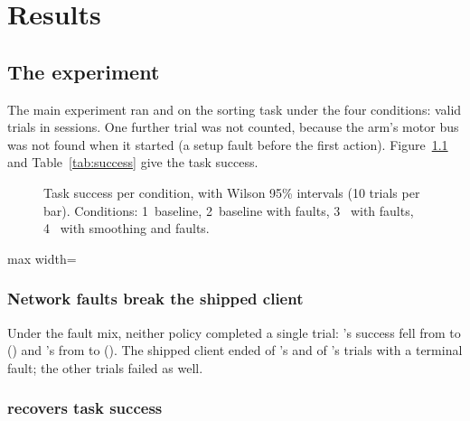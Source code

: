 \chapter{Results}\label{ch:results}

\section{The \drtc{} experiment}\label{sec:main}

The main experiment ran \smolvla{} and \groot{} on the sorting task under the four conditions:  valid trials
in  sessions. One further trial was not counted, because the arm's motor bus was not found when it
started (a setup fault before the first action). Figure~\ref{fig:success} and Table~\ref{tab:success} give the task
success.

\begin{figure}[htbp]
  \centering
  \caption{Task success per condition, with Wilson 95\% intervals (10 trials per bar). Conditions: 1~baseline,
           2~baseline with faults, 3~\drtc{} with faults, 4~\drtc{} with smoothing and faults.}
  \label{fig:success}
\end{figure}

\begin{table}[htbp]
  \centering
  \caption{Task success, its 95\% interval, and the trials ended by a fault.}
  \label{tab:success}
  \small
  \begin{adjustbox}{max width=\textwidth}
  \end{adjustbox}
\end{table}

\subsection{Network faults break the shipped client}

Under the fault mix, neither policy completed a single trial: \smolvla's success fell from 
to  () and \groot's from  to
 (). The shipped client ended 
of \smolvla's and  of \groot's trials with a terminal fault; the other trials failed as well.


\subsection{\drtc{} recovers task success}

